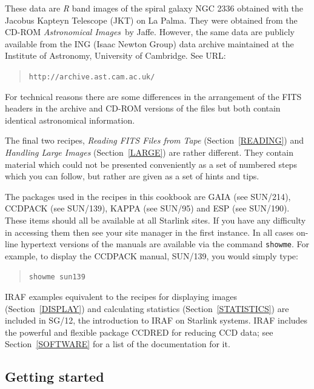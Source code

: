 \documentclass[twoside,11pt]{article}
\newcommand{\htmladdnormallink}[2]{#1}
\newcommand{\xref}[3]{#1}
\begin{document}
These data are {\it R}\/ band images of the spiral galaxy NGC 2336
obtained with the Jacobus Kapteyn Telescope (JKT) on La Palma.  They were
obtained from the CD-ROM {\it Astronomical Images}\, by
Jaffe\cite{JAFFE98}.  However, the same data are publicly available from
the ING (Isaac Newton Group) data archive maintained at the
\htmladdnormallink{Institute of Astronomy}{http://www.ast.cam.ac.uk/},
\htmladdnormallink{University of Cambridge}{http://www.cam.ac.uk/}.
See URL:

\begin{quote}
\htmladdnormallink{ {\tt http://archive.ast.cam.ac.uk/}}
{http://archive.ast.cam.ac.uk/}
\end{quote}

For technical reasons there are some differences in the arrangement of the
FITS headers in the archive and CD-ROM versions of the files but both
contain identical astronomical information.

The final two recipes, {\it Reading FITS Files from Tape}\/
(Section~\ref{READING}) and {\it Handling Large Images}\/
(Section~\ref{LARGE}) are rather different.  They contain material
which could not be presented conveniently as a set of numbered steps
which you can follow, but rather are given as a set of hints and tips.  

The packages used in the recipes in this cookbook are
GAIA (see \xref{SUN/214}{sun214}{}\/\cite{SUN214}),
CCDPACK (see \xref{SUN/139}{sun139}{}\/\cite{SUN139}),
KAPPA (see \xref{SUN/95}{sun95}{}\/\cite{SUN95}) and
ESP (see \xref{SUN/190}{sun180}{}\/\cite{SUN180}).
These items should all be available at all Starlink sites.  If you have
any difficulty in accessing them then see your site manager in the first
instance.  In all cases on-line hypertext versions of the manuals are
available via the command {\tt showme}.  For example, to display the
CCDPACK manual, SUN/139, you would simply type:

\begin{quote}
{\tt showme sun139}
\end{quote}

IRAF examples equivalent to the recipes for displaying images
(Section~\ref{DISPLAY}) and calculating statistics (Section~\ref{STATISTICS})
are included in \xref{SG/12}{sg12}{}\/\cite{SG12}, the introduction to
IRAF on Starlink systems.  IRAF includes the powerful and flexible package
CCDRED for reducing CCD data; see Section~\ref{SOFTWARE} for a list of the
documentation for it.

\subsection{\label{START}Getting started}
\end{document}
